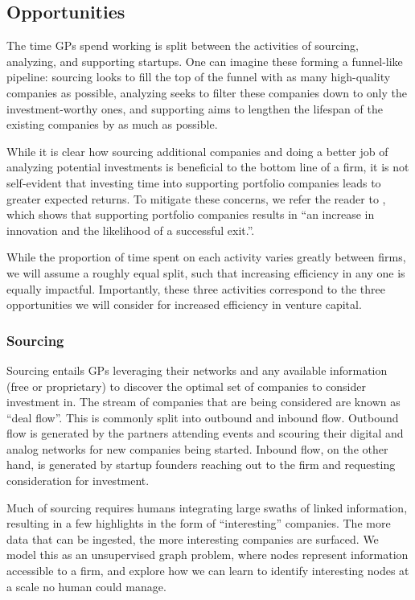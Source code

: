 \subsection{Opportunities}

The time GPs spend working is split between the activities of sourcing, analyzing, and supporting startups. One can imagine these forming a funnel-like pipeline: sourcing looks to fill the top of the funnel with as many high-quality companies as possible, analyzing seeks to filter these companies down to only the investment-worthy ones, and supporting aims to lengthen the lifespan of the existing companies by as much as possible.

While it is clear how sourcing additional companies and doing a better job of analyzing potential investments is beneficial to the bottom line of a firm, it is not self-evident that investing time into supporting portfolio companies leads to greater expected returns. To mitigate these concerns, we refer the reader to \cite{JOFI:JOFI12370}, which shows that supporting portfolio companies results in ``an increase in innovation and the likelihood of a successful exit.''.


While the proportion of time spent on each activity varies greatly between firms, we will assume a roughly equal split, such that increasing efficiency in any one is equally impactful. Importantly, these three activities correspond to the three opportunities we will consider for increased efficiency in venture capital.

\subsubsection{Sourcing}

Sourcing entails GPs leveraging their networks and any available information (free or proprietary) to discover the optimal set of companies to consider investment in. The stream of companies that are being considered are known as ``deal flow''. This is commonly split into outbound and inbound flow. Outbound flow is generated by the partners attending events and scouring their digital and analog networks for new companies being started. Inbound flow, on the other hand, is generated by startup founders reaching out to the firm and requesting consideration for investment.

Much of sourcing requires humans integrating large swaths of linked information, resulting in a few highlights in the form of ``interesting'' companies. The more data that can be ingested, the more interesting companies are surfaced. We model this as an unsupervised graph problem, where nodes represent information accessible to a firm, and explore how we can learn to identify interesting nodes at a scale no human could manage.

